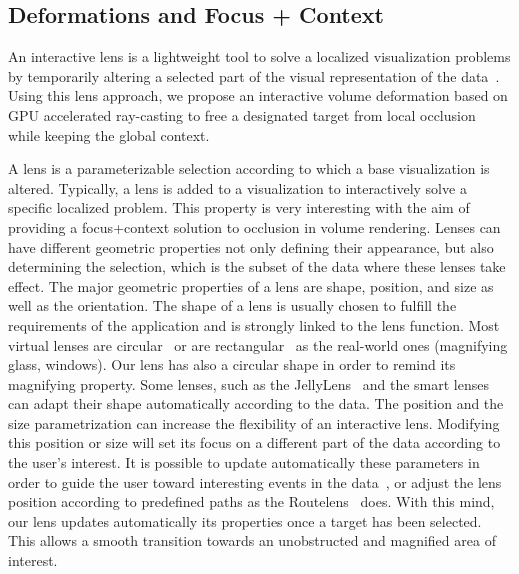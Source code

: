 \subsection{Deformations and Focus + Context}

An interactive lens is a lightweight tool to solve a localized visualization problems by temporarily altering a selected part of the visual representation of the data~\cite{CGF:CGF12871}. Using this lens approach, we propose an interactive volume deformation based on GPU accelerated ray-casting to free a designated target from local occlusion while keeping the global context.

A lens is a parameterizable selection according to which a base visualization is altered. Typically, a lens is added to a visualization to interactively solve a specific localized problem. This property is very interesting with the aim of providing a focus+context solution to occlusion in volume rendering. Lenses can have different geometric properties not only defining their appearance, but also determining the selection, which is the subset of the data where these lenses take effect. The major geometric properties of a lens are shape, position, and size as well as the orientation.
The shape of a lens is usually chosen to fulfill the requirements of the application and is strongly linked to the lens function. Most virtual lenses are circular~\cite{1648236} or are rectangular~\cite{Kincaid:2010:SFA:1907651.1907963} as the real-world ones (magnifying glass, windows). Our lens has also a circular shape in order to remind its magnifying property. Some lenses, such as the  JellyLens~\cite{Pindat:2012:JCA:2380116.2380150} and the smart lenses~\cite{Thiede2008} can adapt their shape automatically according to the data. 
The position and the size parametrization can increase the flexibility of an interactive lens.
Modifying this position or size will set its focus on a different part of the data according to the user's interest. It is possible to update automatically these parameters in order to guide the user toward interesting events in the data~\cite{Tominski:2011:ECU:2336207.2336211}, or adjust the lens position according to predefined paths as the Routelens~\cite{Alvina:2014:RER:2598153.2598200} does. With this mind, our lens updates automatically its properties once a target has been selected. This allows a smooth transition towards an unobstructed and magnified area of interest. 

